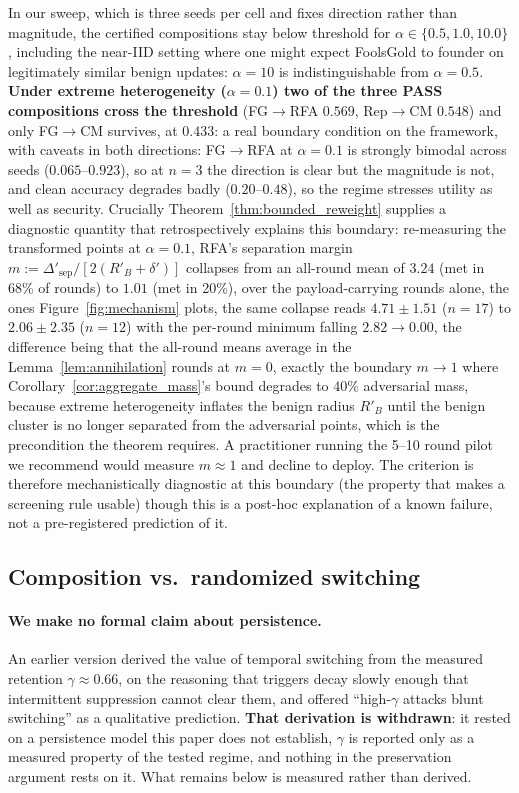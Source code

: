 \documentclass{article}
\begin{document}
\noindent In our sweep, which is three seeds per cell and fixes direction rather than magnitude, the certified compositions stay below threshold for $\alpha \in \{0.5, 1.0, 10.0\}$, including the near-IID setting where one might expect FoolsGold to founder on legitimately similar benign updates: $\alpha{=}10$ is indistinguishable from $\alpha{=}0.5$. \textbf{Under extreme heterogeneity ($\alpha{=}0.1$) two of the three PASS compositions cross the threshold} (FG$\to$RFA $0.569$, Rep$\to$CM $0.548$) and only FG$\to$CM survives, at $0.433$: a real boundary condition on the framework, with caveats in both directions: FG$\to$RFA at $\alpha{=}0.1$ is strongly bimodal across seeds ($0.065$--$0.923$), so at $n{=}3$ the direction is clear but the magnitude is not, and clean accuracy degrades badly ($0.20$--$0.48$), so the regime stresses utility as well as security. Crucially Theorem~\ref{thm:bounded_reweight} supplies a diagnostic quantity that retrospectively explains this boundary: re-measuring the transformed points at $\alpha{=}0.1$, RFA's separation margin $m := \Delta'_{\mathrm{sep}}/[2(R'_B+\delta')]$ collapses from an all-round mean of $3.24$ (met in 68\% of rounds) to $1.01$ (met in 20\%), over the payload-carrying rounds alone, the ones Figure~\ref{fig:mechanism} plots, the same collapse reads $4.71 \pm 1.51$ ($n{=}17$) to $2.06 \pm 2.35$ ($n{=}12$) with the per-round minimum falling $2.82 \to 0.00$, the difference being that the all-round means average in the Lemma~\ref{lem:annihilation} rounds at $m{=}0$, exactly the boundary $m \to 1$ where Corollary~\ref{cor:aggregate_mass}'s bound degrades to $40\%$ adversarial mass, because extreme heterogeneity inflates the benign radius $R'_B$ until the benign cluster is no longer separated from the adversarial points, which is the precondition the theorem requires. A practitioner running the 5--10 round pilot we recommend would measure $m \approx 1$ and decline to deploy. The criterion is therefore mechanistically diagnostic at this boundary (the property that makes a screening rule usable) though this is a post-hoc explanation of a known failure, not a pre-registered prediction of it.

\subsection{Composition vs.\ randomized switching}
\label{sec:mixing}

\paragraph{We make no formal claim about persistence.} An earlier version derived the value of temporal switching from the measured retention $\gamma \approx 0.66$, on the reasoning that triggers decay slowly enough that intermittent suppression cannot clear them, and offered ``high-$\gamma$ attacks blunt switching'' as a qualitative prediction. \textbf{That derivation is withdrawn}: it rested on a persistence model this paper does not establish, $\gamma$ is reported only as a measured property of the tested regime, and nothing in the preservation argument rests on it. What remains below is measured rather than derived.
\end{document}
